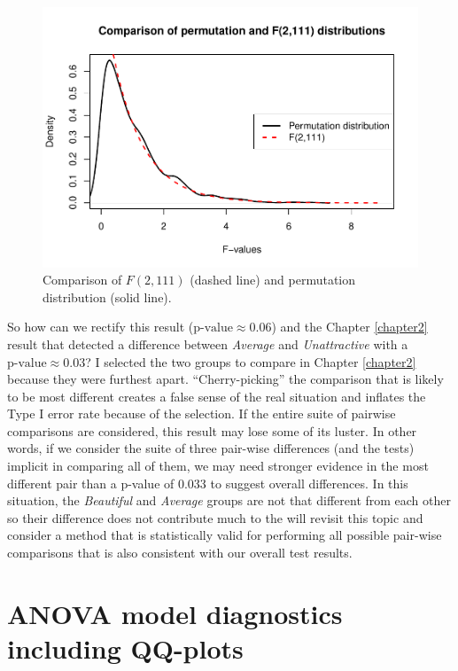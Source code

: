\documentclass[]{book}
\theoremstyle{definition}
\theoremstyle{definition}
\theoremstyle{remark}
\begin{document}
\begin{figure}
\centering
\includegraphics{03-oneWayAnova_files/figure-latex/Figure3-8-1.pdf}
\caption{\label{fig:Figure3-8}Comparison of \(F(2, 111)\) (dashed line) and permutation
distribution (solid line).}
\end{figure}

So how can we rectify this result (\(\text{p-value}\approx 0.06\)) and
the Chapter \ref{chapter2} result that detected a difference between
\emph{Average} and \emph{Unattractive} with a
\(\text{p-value}\approx 0.03\)? I selected the two groups to compare in
Chapter \ref{chapter2} because they were furthest apart.
``Cherry-picking'' the comparison that is likely to be most different
creates a false sense of the real situation and inflates the Type I
error rate because of the selection. If the entire suite of pairwise
comparisons are considered, this result may lose some of its luster. In
other words, if we consider the suite of three pair-wise differences
(and the tests) implicit in comparing all of them, we may need stronger
evidence in the most different pair than a p-value of 0.033 to suggest
overall differences. In this situation, the \emph{Beautiful} and
\emph{Average} groups are not that different from each other so their
difference does not contribute much to the will revisit this topic and
consider a method that is statistically valid for performing all
possible pair-wise comparisons that is also consistent with our overall
test results.

\section{ANOVA model diagnostics including QQ-plots}\label{section3-4}
\end{document}
